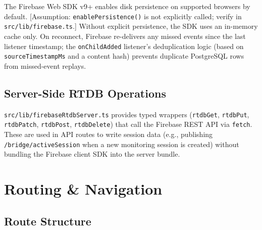\documentclass[12pt,a4paper]{report}
\begin{document}
The Firebase Web SDK v9+ enables disk persistence on supported browsers
by default. [Assumption: \texttt{enablePersistence()} is not explicitly
called; verify in \texttt{src/lib/firebase.ts}.] Without explicit
persistence, the SDK uses an in-memory cache only. On reconnect,
Firebase re-delivers any missed events since the last listener
timestamp; the \texttt{onChildAdded} listener's deduplication logic
(based on \texttt{sourceTimestampMs} and a content hash) prevents
duplicate PostgreSQL rows from missed-event replays.

\subsection{Server-Side RTDB Operations}

\texttt{src/lib/firebaseRtdbServer.ts} provides typed wrappers
(\texttt{rtdbGet}, \texttt{rtdbPut}, \texttt{rtdbPatch}, \texttt{rtdbPost},
\texttt{rtdbDelete}) that call the Firebase REST API via \texttt{fetch}.
These are used in API routes to write session data (e.g., publishing
\texttt{/bridge/activeSession} when a new monitoring session is created)
without bundling the Firebase client SDK into the server bundle.

\section{Routing \& Navigation}
\label{sec:routing}

\subsection{Route Structure}
\end{document}
